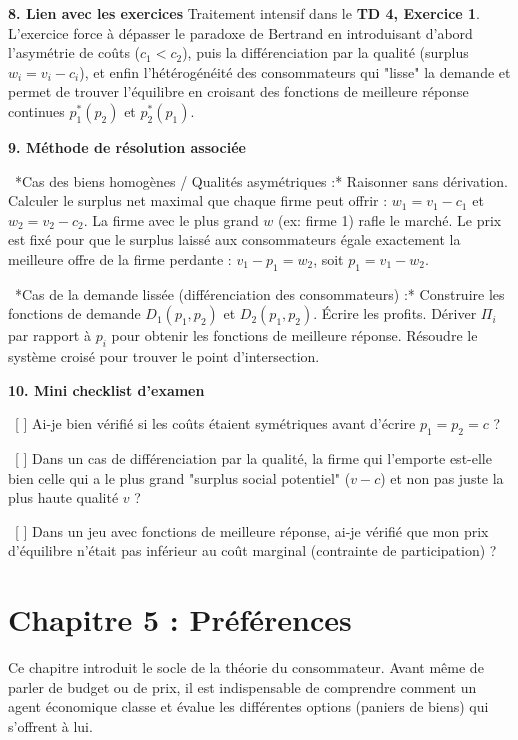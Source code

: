 \documentclass[11pt, a4paper]{report}
\begin{document}
\textbf{8. Lien avec les exercices}
Traitement intensif dans le \textbf{TD 4, Exercice 1}. L'exercice force à dépasser le paradoxe de Bertrand en introduisant d'abord l'asymétrie de coûts ($c_1 < c_2$), puis la différenciation par la qualité (surplus $w_i = v_i - c_i$), et enfin l'hétérogénéité des consommateurs qui "lisse" la demande et permet de trouver l'équilibre en croisant des fonctions de meilleure réponse continues $p_1^*(p_2)$ et $p_2^*(p_1)$.

\textbf{9. Méthode de résolution associée}
\par \textbullet\ *Cas des biens homogènes / Qualités asymétriques :* Raisonner sans dérivation. Calculer le surplus net maximal que chaque firme peut offrir : $w_1 = v_1 - c_1$ et $w_2 = v_2 - c_2$. La firme avec le plus grand $w$ (ex: firme 1) rafle le marché. Le prix est fixé pour que le surplus laissé aux consommateurs égale exactement la meilleure offre de la firme perdante : $v_1 - p_1 = w_2$, soit $p_1 = v_1 - w_2$.
\par \textbullet\ *Cas de la demande lissée (différenciation des consommateurs) :* Construire les fonctions de demande $D_1(p_1, p_2)$ et $D_2(p_1, p_2)$. Écrire les profits. Dériver $\Pi_i$ par rapport à $p_i$ pour obtenir les fonctions de meilleure réponse. Résoudre le système croisé pour trouver le point d'intersection.

\textbf{10. Mini checklist d’examen}
\par \textbullet\ [ ] Ai-je bien vérifié si les coûts étaient symétriques avant d'écrire $p_1 = p_2 = c$ ?
\par \textbullet\ [ ] Dans un cas de différenciation par la qualité, la firme qui l'emporte est-elle bien celle qui a le plus grand "surplus social potentiel" ($v-c$) et non pas juste la plus haute qualité $v$ ?
\par \textbullet\ [ ] Dans un jeu avec fonctions de meilleure réponse, ai-je vérifié que mon prix d'équilibre n'était pas inférieur au coût marginal (contrainte de participation) ?
\newpage
\chapter{Chapitre 5 : Préférences}

Ce chapitre introduit le socle de la théorie du consommateur. Avant même de parler de budget ou de prix, il est indispensable de comprendre comment un agent économique classe et évalue les différentes options (paniers de biens) qui s'offrent à lui. 
\end{document}
